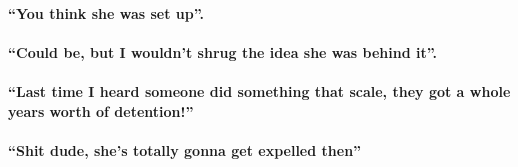 \documentclass{book}
\begin{document}
\paragraph{``You think she was set up''.}
\paragraph{``Could be, but I wouldn't shrug the idea she was behind it''.}
\paragraph{``Last time I heard someone did something that scale, they got a whole years worth of detention!''}
\paragraph{``Shit dude, she's totally gonna get expelled then''}



\end{document}
